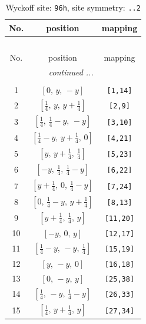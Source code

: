 \documentclass[fleqn,8pt]{jsarticle}
\begin{document}
\renewcommand{\arraystretch}{1.2}
\begin{longtable}{ccc}
\caption{Wyckoff site: {\tt 96h}, site symmetry: {\tt ..2}}
 \\
 \hline \hline
No. & position & mapping \\ \hline \endfirsthead

\multicolumn{2}{l}{\tablename\ \thetable{}} \\
 \hline \hline
No. & position & mapping \\ \hline \endhead

 \hline \hline
\multicolumn{2}{r}{\footnotesize\it continued ...} \\ \endfoot

 \hline \hline
\multicolumn{2}{r}{} \\ \endlastfoot

1 & $\left[ 0,\, y,\, - y \right]$ & {\tt [1,14]} \\ \hline
2 & $\left[ \frac{1}{4},\, y,\, y + \frac{1}{4} \right]$ & {\tt [2,9]} \\ \hline
3 & $\left[ \frac{1}{4},\, \frac{1}{4} - y,\, - y \right]$ & {\tt [3,10]} \\ \hline
4 & $\left[ \frac{1}{4} - y,\, y + \frac{1}{4},\, 0 \right]$ & {\tt [4,21]} \\ \hline
5 & $\left[ y,\, y + \frac{1}{4},\, \frac{1}{4} \right]$ & {\tt [5,23]} \\ \hline
6 & $\left[ - y,\, \frac{1}{4},\, \frac{1}{4} - y \right]$ & {\tt [6,22]} \\ \hline
7 & $\left[ y + \frac{1}{4},\, 0,\, \frac{1}{4} - y \right]$ & {\tt [7,24]} \\ \hline
8 & $\left[ 0,\, \frac{1}{4} - y,\, y + \frac{1}{4} \right]$ & {\tt [8,13]} \\ \hline
9 & $\left[ y + \frac{1}{4},\, \frac{1}{4},\, y \right]$ & {\tt [11,20]} \\ \hline
10 & $\left[ - y,\, 0,\, y \right]$ & {\tt [12,17]} \\ \hline
11 & $\left[ \frac{1}{4} - y,\, - y,\, \frac{1}{4} \right]$ & {\tt [15,19]} \\ \hline
12 & $\left[ y,\, - y,\, 0 \right]$ & {\tt [16,18]} \\ \hline
13 & $\left[ 0,\, - y,\, y \right]$ & {\tt [25,38]} \\ \hline
14 & $\left[ \frac{1}{4},\, - y,\, \frac{1}{4} - y \right]$ & {\tt [26,33]} \\ \hline
15 & $\left[ \frac{1}{4},\, y + \frac{1}{4},\, y \right]$ & {\tt [27,34]} \\ \hline

\end{longtable}
\end{document}
